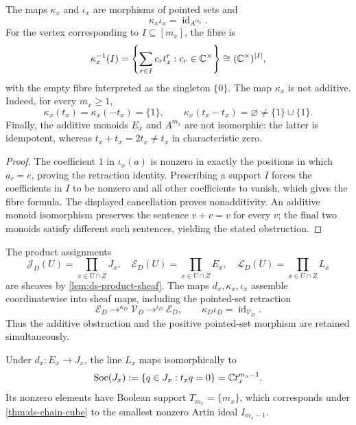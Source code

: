 \begin{proposition}
\label{prop:ds-jet-support}
The maps $\kappa_x$ and $\iota_x$ are morphisms of pointed sets and
\[
 \kappa_x\iota_x=\operatorname{id}_{A^{m_x}}.
\]
For the vertex corresponding to $I\subseteq[m_x]$, the fibre is
\[
 \kappa_x^{-1}(I)=
 \left\{\sum_{r\in I}c_rt_x^r:c_r\in\mathbb C^\times\right\}
 \cong(\mathbb C^\times)^{|I|},
\]
with the empty fibre interpreted as the singleton $\{0\}$.  The map $\kappa_x$
is not additive.  Indeed, for every $m_x\geq1$,
\[
 \kappa_x(t_x)=\kappa_x(-t_x)=\{1\},
 \qquad
 \kappa_x(t_x-t_x)=\varnothing
 \ne\{1\}\cup\{1\}.
\]
Finally, the additive monoids $E_x$ and $A^{m_x}$ are not isomorphic: the latter
is idempotent, whereas $t_x+t_x=2t_x\ne t_x$ in characteristic zero.
\end{proposition}

\begin{proof}
The coefficient $1$ in $\iota_x(a)$ is nonzero in exactly the positions in which
$a_r=e$, proving the retraction identity.  Prescribing a support $I$ forces the
coefficients in $I$ to be nonzero and all other coefficients to vanish, which gives
the fibre formula.  The displayed cancellation proves nonadditivity.  An additive
monoid isomorphism preserves the sentence $v+v=v$ for every $v$; the final two
monoids satisfy different such sentences, yielding the stated obstruction.
\end{proof}

The product assignments
\[
 \mathcal J_D(U)=\prod_{x\in U\cap Z}J_x,
 \quad
 \mathcal E_D(U)=\prod_{x\in U\cap Z}E_x,
 \quad
 \mathcal L_D(U)=\prod_{x\in U\cap Z}L_x
\]
are sheaves by \cref{lem:ds-product-sheaf}.  The maps $d_x,\kappa_x,\iota_x$
assemble coordinatewise into sheaf maps, including the pointed-set retraction
\[
 \mathcal E_D\mathop{\longrightarrow}^{\kappa_D}\mathcal V_D
 \mathop{\longrightarrow}^{\iota_D}\mathcal E_D,
 \qquad \kappa_D\iota_D=\operatorname{id}_{\mathcal V_D}.
\]
Thus the additive obstruction and the positive pointed-set morphism are retained
simultaneously.

\begin{proposition}
\label{prop:ds-terminal-socle}
Under $d_x:E_x\to J_x$, the line $L_x$ maps isomorphically to
\[
 \operatorname{Soc}(J_x)
 :=\{q\in J_x:t_xq=0\}
 =\mathbb C t_x^{m_x-1}.
\]
Its nonzero elements have Boolean support $T_{m_x}=\{m_x\}$, which corresponds
under \cref{thm:ds-chain-cube} to the smallest nonzero Artin ideal
$I_{m_x-1}$.
\end{proposition}

